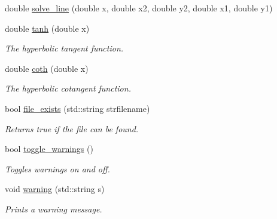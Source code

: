 \begin{DoxyCompactItemize}
$$double \hyperlink{namespacepyne_a943fe41cf25ff550684aabffe5971e1e}{solve\+\_\+line} (double x, double x2, double y2, double x1, double y1)
\item 
\mbox{\label{namespacepyne_a598ae3065c54502a23495eaf06865d1d}} 
double \hyperlink{namespacepyne_a598ae3065c54502a23495eaf06865d1d}{tanh} (double x)
\begin{DoxyCompactList}\small\item\em The hyperbolic tangent function. \end{DoxyCompactList}\item 
\mbox{\label{namespacepyne_a03cad3093b97f2f6a5dcb5cdc4cb562e}} 
double \hyperlink{namespacepyne_a03cad3093b97f2f6a5dcb5cdc4cb562e}{coth} (double x)
\begin{DoxyCompactList}\small\item\em The hyperbolic cotangent function. \end{DoxyCompactList}\item 
\mbox{\label{namespacepyne_ad514c252885b18fb9c6ef3ac5f0ac680}} 
bool \hyperlink{namespacepyne_ad514c252885b18fb9c6ef3ac5f0ac680}{file\+\_\+exists} (std\+::string strfilename)
\begin{DoxyCompactList}\small\item\em Returns true if the file can be found. \end{DoxyCompactList}\item 
\mbox{\label{namespacepyne_a6dea834f084c2ff3a3c8ce67c3eaf8e1}} 
bool \hyperlink{namespacepyne_a6dea834f084c2ff3a3c8ce67c3eaf8e1}{toggle\+\_\+warnings} ()
\begin{DoxyCompactList}\small\item\em Toggles warnings on and off. \end{DoxyCompactList}\item 
\mbox{\label{namespacepyne_ab952e7e8ee07bf181ad5439e27ae1604}} 
void \hyperlink{namespacepyne_ab952e7e8ee07bf181ad5439e27ae1604}{warning} (std\+::string s)
\begin{DoxyCompactList}\small\item\em Prints a warning message. \end{DoxyCompactList}\end{DoxyCompactItemize}

